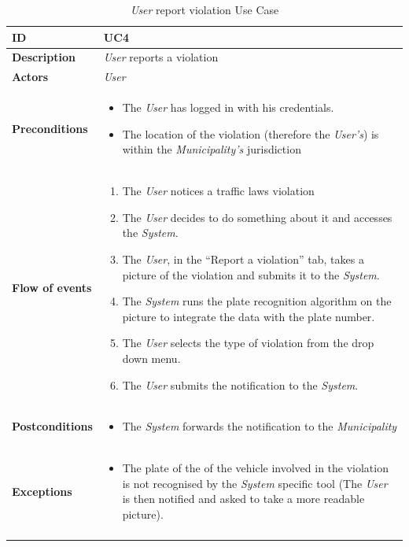\documentclass {article}
\begin{document}
	\begin{longtable}{| p{3 cm} | p{10.5 cm} |} 
			\hline
			{\bf ID} & UC4 \\
			\hline
			{\bf Description} & {\it User} reports a violation \\
			\hline
			{\bf Actors} & {\it User}\\
			\hline
			{\bf Preconditions} & \begin{itemize}
								  \item The {\it User} has logged in with his credentials.
								  \item The location of the violation (therefore the {\it User's}) is within the {\it Municipality's} jurisdiction
								  \end{itemize}	\\
			\hline
			{\bf Flow of events} &	\begin{enumerate}
								  \item The {\it User} notices a traffic laws violation 
								  \item The {\it User} decides to do something about it and accesses the {\it System}.
								  \item The {\it User}, in the “Report a violation” tab, takes a picture of the violation and submits it to the {\it System}.
								  \item The {\it System} runs the plate recognition algorithm on the picture to integrate the data with the plate number.
								  \item The {\it User} selects the type of violation from the drop down menu.
								  \item The {\it User} submits the notification to the {\it System}.
								  \end{enumerate}	\\
			\hline
			{\bf Postconditions} & \begin{itemize}
								  \item The {\it System} forwards the notification to the {\it Municipality}
								  \end{itemize}	 \\
			\hline
			{\bf Exceptions} & 	\begin{itemize}
								  \item The plate of the of the vehicle involved in the violation is not recognised by the {\it System} specific tool (The {\it User} is then notified and asked to take a more readable picture).
								  \end{itemize}	\\
			\hline
			\caption{{\it User} report violation Use Case}
			\end{longtable}
			
\end{document}
